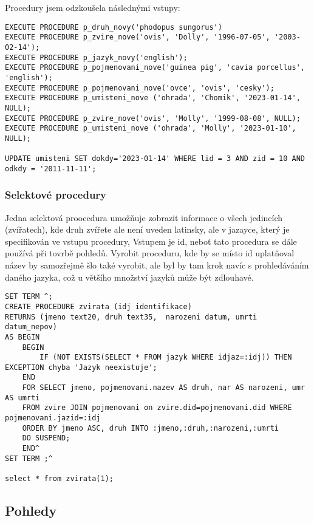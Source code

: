 \documentclass{article}
\begin{document}
Procedury jsem odzkoušela následnými vstupy:

\begin{lstlisting}
EXECUTE PROCEDURE p_druh_novy('phodopus sungorus')
EXECUTE PROCEDURE p_zvire_nove('ovis', 'Dolly', '1996-07-05', '2003-02-14');
EXECUTE PROCEDURE p_jazyk_novy('english');
EXECUTE PROCEDURE p_pojmenovani_nove('guinea pig', 'cavia porcellus', 'english');
EXECUTE PROCEDURE p_pojmenovani_nove('ovce', 'ovis', 'cesky');
EXECUTE PROCEDURE p_umisteni_nove ('ohrada', 'Chomik', '2023-01-14', NULL);
EXECUTE PROCEDURE p_zvire_nove('ovis', 'Molly', '1999-08-08', NULL);
EXECUTE PROCEDURE p_umisteni_nove ('ohrada', 'Molly', '2023-01-10', NULL);

UPDATE umisteni SET dokdy='2023-01-14' WHERE lid = 3 AND zid = 10 AND odkdy = '2011-11-11';
\end{lstlisting}

\subsubsection{Selektové procedury}

Jedna selektová proocedura umožňuje zobrazit informace o všech jedincích (zvířatech), kde druh zvířete ale není uveden latinsky, ale v jazayce, který je specifikován ve vstupu procedury, Vstupem je id, neboť tato procedura se dále používá při tovrbě pohledů. Vyrobit proceduru, kde by se místo id uplatňoval název by samozřejmě šlo také vyrobit, ale byl by tam krok navíc s prohledáváním daného jazyka, což u většího množství jazyků může být zdlouhavé.

\begin{lstlisting}
SET TERM ^;
CREATE PROCEDURE zvirata (idj identifikace)
RETURNS (jmeno text20, druh text35,  narozeni datum, umrti datum_nepov)
AS BEGIN 
    BEGIN
        IF (NOT EXISTS(SELECT * FROM jazyk WHERE idjaz=:idj)) THEN EXCEPTION chyba 'Jazyk neexistuje'; 
    END 
    FOR SELECT jmeno, pojmenovani.nazev AS druh, nar AS narozeni, umr AS umrti
    FROM zvire JOIN pojmenovani on zvire.did=pojmenovani.did WHERE pojmenovani.jazid=:idj 
    ORDER BY jmeno ASC, druh INTO :jmeno,:druh,:narozeni,:umrti 
    DO SUSPEND; 
    END^
SET TERM ;^

select * from zvirata(1);
\end{lstlisting}

\subsection{Pohledy}
\end{document}
